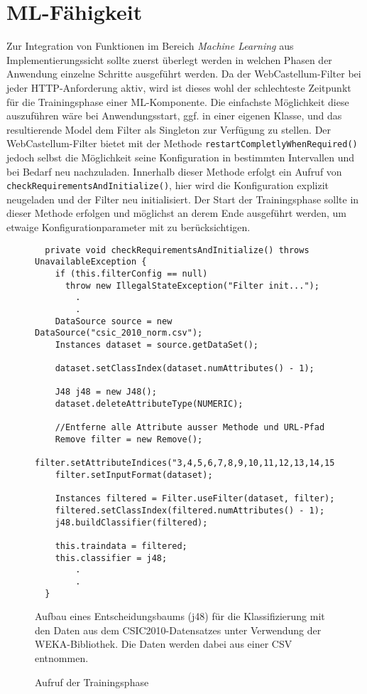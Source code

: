 \section{ML-Fähigkeit}
\label{sec:mlfk}

Zur Integration von Funktionen im Bereich \emph{Machine Learning} aus Implementierungssicht sollte zuerst überlegt werden in welchen Phasen der Anwendung einzelne Schritte ausgeführt werden. Da der WebCastellum-Filter bei jeder HTTP-Anforderung aktiv, wird ist dieses wohl der schlechteste Zeitpunkt für die Trainingsphase einer ML-Komponente. Die einfachste Möglichkeit diese auszuführen wäre bei Anwendungsstart, ggf. in einer eigenen Klasse, und das resultierende Model dem Filter als Singleton zur Verfügung zu stellen. Der WebCastellum-Filter bietet mit der Methode \verb=restartCompletlyWhenRequired()= jedoch selbst die Möglichkeit seine Konfiguration in bestimmten Intervallen und bei Bedarf neu nachzuladen. Innerhalb dieser Methode erfolgt ein Aufruf von \verb=checkRequirementsAndInitialize()=, hier wird die Konfiguration explizit neugeladen und der Filter neu initialisiert. Der Start der Trainingsphase sollte in dieser Methode erfolgen und möglichst an derem Ende ausgeführt werden, um etwaige Konfigurationparameter mit zu berücksichtigen.\\

\begin{figure}[h]
  \centering
  \begin{lstlisting}
  private void checkRequirementsAndInitialize() throws UnavailableException {
    if (this.filterConfig == null)
      throw new IllegalStateException("Filter init...");
        .
        .
    DataSource source = new DataSource("csic_2010_norm.csv");
    Instances dataset = source.getDataSet();
                       
    dataset.setClassIndex(dataset.numAttributes() - 1);

    J48 j48 = new J48();
    dataset.deleteAttributeType(NUMERIC);

    //Entferne alle Attribute ausser Methode und URL-Pfad
    Remove filter = new Remove();
    filter.setAttributeIndices("3,4,5,6,7,8,9,10,11,12,13,14,15,16,17");
    filter.setInputFormat(dataset);

    Instances filtered = Filter.useFilter(dataset, filter);
    filtered.setClassIndex(filtered.numAttributes() - 1);
    j48.buildClassifier(filtered);

    this.traindata = filtered;
    this.classifier = j48;
        .
        .
  }
\end{lstlisting}
\caption{Aufruf der Trainingsphase}
\medskip
\small
Aufbau eines Entscheidungsbaums (j48) für die Klassifizierung mit den Daten aus dem CSIC2010-Datensatzes unter Verwendung der WEKA-Bibliothek. Die Daten werden dabei aus einer CSV entnommen.
\label{fig:wekatrain}

\end{figure}


